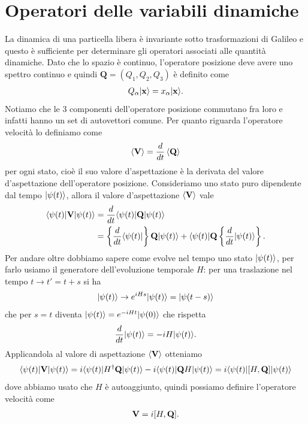\section{Operatori delle variabili dinamiche}

La dinamica di una particella libera è invariante sotto trasformazioni di Galileo e questo è sufficiente per determinare gli operatori associati alle 
quantità dinamiche. Dato che lo spazio è continuo, l'operatore posizione deve avere uno spettro continuo e quindi $ \mathbf{Q} = (Q_1, Q_2, Q_3) $ 
è definito come 
\begin{align*}
  Q_\alpha \vert \mathbf{x} \rangle = x_\alpha \vert \mathbf{x} \rangle.
\end{align*}
Notiamo che le 3 componenti dell'operatore posizione commutano fra loro e infatti hanno un set di autovettori comune. Per quanto riguarda 
l'operatore velocità lo definiamo come 
\begin{align*}
  \left< \mathbf{V} \right> = \frac{d}{dt} \left< \mathbf{Q} \right>
\end{align*}
per ogni stato, cioè il suo valore d'aspettazione è la derivata del valore d'aspettazione dell'operatore posizione. Consideriamo uno stato 
puro dipendente dal tempo $ \vert \psi(t) \rangle $, allora il valore d'aspettazione $ \langle \mathbf{V} \rangle $ vale 
\begin{align*}
  \langle \psi(t) | \mathbf{V} | \psi(t) \rangle &= \frac{d}{dt} \langle \psi(t) | \mathbf{Q} | \psi(t) \rangle 
  \\
  &= \left\{\frac{d}{dt} \langle \psi(t) \vert\right\} \mathbf{Q} \vert \psi(t) \rangle + \langle \psi(t) \vert \mathbf{Q} \left\{\frac{d}{dt} \vert \psi(t) \rangle\right\}.
\end{align*}
Per andare oltre dobbiamo sapere come evolve nel tempo uno stato $ \vert \psi(t) \rangle $, per farlo usiamo il generatore dell'evoluzione temporale $ H $:
per una traslazione nel tempo $ t \to t' = t + s $ si ha
\begin{align*}
  \vert \psi(t) \rangle \to e^{i H s} \vert \psi(t) \rangle = \vert \psi(t - s) \rangle
\end{align*}
che per $ s = t $ diventa $  \vert \psi(t) \rangle = e^{ -i H t} \vert \psi(0) \rangle $ che rispetta 
\begin{align*}
  \frac{d}{dt} \vert \psi(t) \rangle = - i H \vert \psi(t) \rangle.
\end{align*}
Applicandola al valore di aspettazione $ \langle \mathbf{V} \rangle $ otteniamo
\begin{align*}
  \langle \psi(t) | \mathbf{V} | \psi(t) \rangle = i\langle \psi(t) \vert H^\dag \mathbf{Q} \vert \psi(t) \rangle - i \langle \psi(t) \vert \mathbf{Q} H\vert \psi(t) \rangle = i \langle \psi(t) | [H, \mathbf{Q}] |\psi(t) \rangle
\end{align*}
dove abbiamo usato che $ H $ è autoaggiunto, quindi possiamo definire l'operatore velocità come 
\begin{align*}
  \mathbf{V} = i [H, \mathbf{Q}].
\end{align*}

